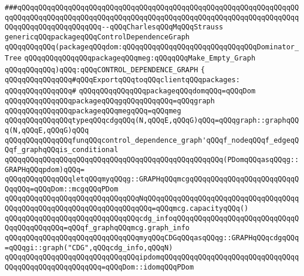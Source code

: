 \verb|###qQQqqQQqqQQqqQQqqQQqqQQqqQQqqQQqqQQqqQQqqQQqqQQqqQQqqQQqqQQqqQQqqQQqqQQqqQQqqQQqqQQqqQQqqQQqqQQqqQQqqQQqqQQqqQQqqQQqqQQqqQQqqQQqqQQqqQQqqQQqqQQqqQQqqQQqqQQqqQQq--qQQqCharlesqQQqMqQQqStrauss|\newline
\newline
\newline
\verb|genericqQQqpackageqQQqControlDependenceGraph|\newline
\verb|qQQqqQQqqQQq(packageqQQqdom:qQQqqQQqqQQqqQQqqQQqqQQqqQQqqQQqDominator_Tree|\newline
\verb|qQQqqQQqqQQqqQQqpackageqQQqmeg:qQQqqQQqMake_Empty_Graph|\newline
\verb|qQQqqQQqqQQq)qQQq:qQQqCONTROL_DEPENDENCE_GRAPH|\newline
\newline
\verb|{|\newline
\verb|qQQqqQQqqQQqqQQq#qQQqExportqQQqtoqQQqclientqQQqpackages:|\newline
\verb|qQQqqQQqqQQqqQQq#|\newline
\verb|qQQqqQQqqQQqqQQqpackageqQQqdomqQQq=qQQqDom|\newline
\verb|qQQqqQQqqQQqqQQqpackageqQQqgqQQqqQQqqQQq=qQQqgraph|\newline
\verb|qQQqqQQqqQQqqQQqpackageqQQqmegqQQq=qQQqmeg|\newline
\newline
\verb|qQQqqQQqqQQqqQQqtypeqQQqcdgqQQq(N,qQQqE,qQQqG)qQQq=qQQqgraph::graphqQQq(N,qQQqE,qQQqG)qQQq|\newline
\newline
\verb|qQQqqQQqqQQqqQQqfunqQQqcontrol_dependence_graph'qQQqf_nodeqQQqf_edgeqQQqf_graphqQQqis_conditional|\newline
\verb|qQQqqQQqqQQqqQQqqQQqqQQqqQQqqQQqqQQqqQQqqQQqqQQqqQQq(PDomqQQqasqQQqg::GRAPHqQQqpdom)qQQq=|\newline
\verb|qQQqqQQqqQQqqQQqletqQQqmyqQQqg::GRAPHqQQqmcgqQQqqQQqqQQqqQQqqQQqqQQqqQQqqQQq=qQQqDom::mcgqQQqPDom|\newline
\verb|qQQqqQQqqQQqqQQqqQQqqQQqqQQqqQQqNqQQqqQQqqQQqqQQqqQQqqQQqqQQqqQQqqQQqqQQqqQQqqQQqqQQqqQQqqQQqqQQqqQQqqQQq=qQQqmcg.capacityqQQq()|\newline
\verb|qQQqqQQqqQQqqQQqqQQqqQQqqQQqqQQqcdg_infoqQQqqQQqqQQqqQQqqQQqqQQqqQQqqQQqqQQqqQQqqQQq=qQQqf_graphqQQqmcg.graph_info|\newline
\verb|qQQqqQQqqQQqqQQqqQQqqQQqqQQqqQQqmyqQQqCDGqQQqasqQQqg::GRAPHqQQqcdgqQQq=qQQqgi::graph("CDG",qQQqcdg_info,qQQqN)|\newline
\verb|qQQqqQQqqQQqqQQqqQQqqQQqqQQqqQQqipdomqQQqqQQqqQQqqQQqqQQqqQQqqQQqqQQqqQQqqQQqqQQqqQQqqQQqqQQq=qQQqDom::idomqQQqPDom|\newline
